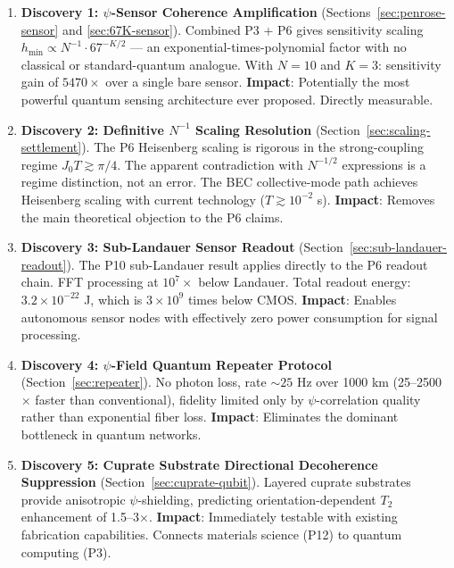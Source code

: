 \documentclass[11pt]{article}
\theoremstyle{definition}
\theoremstyle{remark}
\begin{document}
\begin{enumerate}
\item \textbf{Discovery 1: $\psi$-Sensor Coherence Amplification}
(Sections~\ref{sec:penrose-sensor} and \ref{sec:67K-sensor}).
Combined P3 + P6 gives sensitivity scaling
$h_{\min} \propto N^{-1} \cdot 67^{-K/2}$ --- an exponential-times-polynomial
factor with no classical or standard-quantum analogue. With $N = 10$
and $K = 3$: sensitivity gain of $5470\times$ over a single bare sensor.
\textbf{Impact}: Potentially the most powerful quantum sensing architecture
ever proposed. Directly measurable.

\item \textbf{Discovery 2: Definitive $N^{-1}$ Scaling Resolution}
(Section~\ref{sec:scaling-settlement}). The P6 Heisenberg scaling
is rigorous in the strong-coupling regime $J_0 T \gtrsim \pi/4$.
The apparent contradiction with $N^{-1/2}$ expressions is a regime
distinction, not an error. The BEC collective-mode path achieves
Heisenberg scaling with current technology ($T \gtrsim 10^{-2}$ s).
\textbf{Impact}: Removes the main theoretical objection to the P6 claims.

\item \textbf{Discovery 3: Sub-Landauer Sensor Readout}
(Section~\ref{sec:sub-landauer-readout}). The P10 sub-Landauer
result applies directly to the P6 readout chain. FFT processing at
$10^7\times$ below Landauer. Total readout energy: $3.2\times 10^{-22}$ J,
which is $3\times 10^9$ times below CMOS.
\textbf{Impact}: Enables autonomous sensor nodes with
effectively zero power consumption for signal processing.

\item \textbf{Discovery 4: $\psi$-Field Quantum Repeater Protocol}
(Section~\ref{sec:repeater}). No photon loss, rate $\sim 25$ Hz over
1000 km (25--2500$\times$ faster than conventional), fidelity limited
only by $\psi$-correlation quality rather than exponential fiber loss.
\textbf{Impact}: Eliminates the dominant bottleneck in quantum networks.

\item \textbf{Discovery 5: Cuprate Substrate Directional Decoherence
Suppression} (Section~\ref{sec:cuprate-qubit}). Layered cuprate
substrates provide anisotropic $\psi$-shielding, predicting
orientation-dependent $T_2$ enhancement of 1.5--3$\times$.
\textbf{Impact}: Immediately testable with existing fabrication
capabilities. Connects materials science (P12) to quantum
computing (P3).
\end{enumerate}
\end{document}
